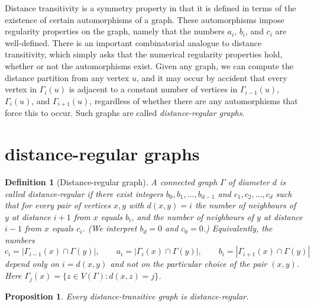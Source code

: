 \documentclass[12pt,a4paper,openany]{book}
\newtheorem{definition}{Definition}[section]
\newtheorem{proposition}{Proposition}[section]
\begin{document}
Distance transitivity is a symmetry property in that it is defined in terms of the existence of certain automorphisms of a graph. These automorphisms impose regularity properties on the graph, namely that the numbers $a_i$, $b_i$, and $c_i$ are well-defined. There is an important combinatorial analogue to distance transitivity, which simply asks that the numerical regularity properties hold, whether or not the automorphisms exist. Given any graph, we can compute the distance partition from any vertex $u$, and it may occur by accident that every vertex in $\Gamma_i(u)$ is adjacent to a constant number of vertices in $\Gamma_{i-1}(u)$, $\Gamma_i(u)$, and $\Gamma_{i+1}(u)$, regardless of whether there are any automorphisms that force this to occur. Such graphs are called \emph{distance-regular graphs}.
\section{distance-regular graphs}

\begin{definition}[Distance-regular graph]
A connected graph $\Gamma$ of diameter $d$ is called \emph{distance-regular}
if there exist integers $b_0,b_1,\dots,b_{d-1}$ and $c_1,c_2,\dots,c_d$
such that for every pair of vertices $x,y$ with $d(x,y)=i$ the number of
neighbours of $y$ at distance $i+1$ from $x$ equals $b_i$, and the number 
of neighbours of $y$ at distance $i-1$ from $x$ equals $c_i$.
(We interpret $b_d=0$ and $c_0=0$.) Equivalently, the numbers
\[
c_i=|\Gamma_{i-1}(x)\cap \Gamma(y)|,\qquad
a_i=|\Gamma_{i}(x)\cap \Gamma(y)|,\qquad
b_i=|\Gamma_{i+1}(x)\cap \Gamma(y)|
\]
depend only on $i=d(x,y)$ and not on the particular choice of the pair
$(x,y)$. Here $\Gamma_j(x)=\{z\in V(\Gamma):d(x,z)=j\}$.
\end{definition}

\begin{proposition}
Every distance-transitive graph is distance-regular.
\end{proposition}
\end{document}
